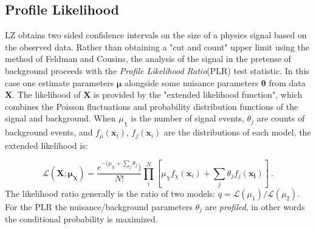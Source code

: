 \subsection{Profile Likelihood}
\label{sec:plr}
LZ obtains two sided confidence intervals on the size of a physics signal based on the observed data.
Rather than obtaining a "cut and count" upper limit using the method of Feldman and Cousins\cite{feldman_unified_1998}, the analysis of the signal in the pretense of background proceeds with the \textit{Profile Likelihood Ratio}(PLR) test statistic.
In this case one estimate parameters $\boldsymbol{\mu}$ alongside  some nuisance parameters $\boldsymbol{\theta}$ from data $\boldsymbol{X}$.
The likelihood of $\boldsymbol{X}$ is provided by the "extended likelihood function"\cite{baker_clarification_1984}, which combines the Poisson fluctuations and probability distribution functions of the signal and background.
When $\mu_\chi$ is the number of signal events, $\theta_j$ are counts of background events, and $f_\mu(\boldsymbol{x}_i)$, $f_j(\boldsymbol{x}_i)$ are the distributions of each model, the extended likelihood is:

\begin{equation}
    \mathcal{L}(\boldsymbol{X}; \boldsymbol{\mu_\chi}) = \frac{e^{-(\mu_\chi + \sum_j \theta_j })}{N!}\prod_i^N[\mu_\chi f_\chi(\boldsymbol{x}_i) + \sum_j \theta_j f_j(\boldsymbol{x_i})]~.
\end{equation}
\noindent
The likelihood ratio generally is the ratio of two models: $q = \mathcal{L}(\mu_1) / \mathcal{L}(\mu_2)$.
For the PLR the nuisance/background parameters $\theta_j$ are \textit{profiled}, in other words the conditional probability is maximized.

